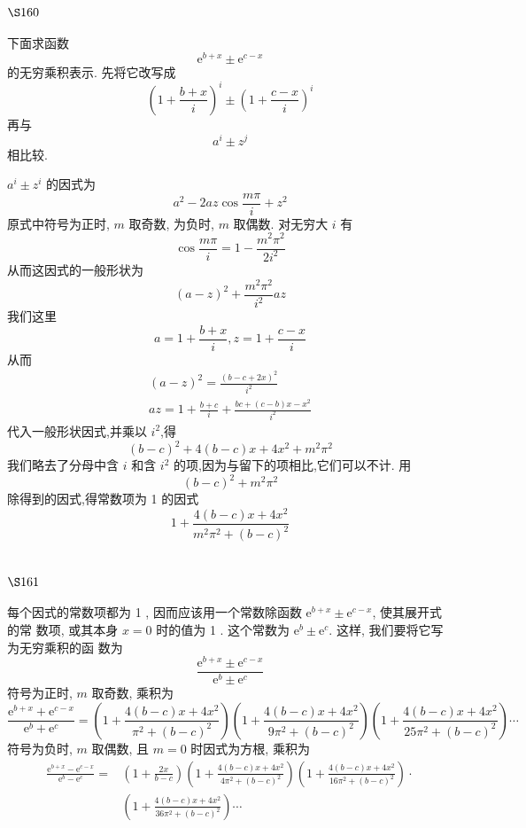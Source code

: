 \section{$\S 160$}

下面求函数
\[
\mathrm{e}^{b+x} \pm \mathrm{e}^{c-x}
\]
的无穷乘积表示. 先将它改写成
\[
\left(1+\frac{b+x}{i}\right)^{i} \pm\left(1+\frac{c-x}{i}\right)^{i}
\]
再与
\[
a^{i} \pm z^{j}
\]
相比较.

$a^{i} \pm z^{i}$ 的因式为
\[
a^{2}-2 a z \cos \frac{m \pi}{i}+z^{2}
\]
原式中符号为正时, $m$ 取奇数, 为负时, $m$ 取偶数. 对无穷大 $i$ 有
\[
\cos \frac{m \pi}{i}=1-\frac{m^{2} \pi^{2}}{2 i^{2}}
\]
从而这因式的一般形状为
\[
(a-z)^{2}+\frac{m^{2} \pi^{2}}{i^{2}} a z
\]
我们这里
\[
a=1+\frac{b+x}{i}, z=1+\frac{c-x}{i}
\]
从而
\[
\begin{gathered}
(a-z)^{2}=\frac{(b-c+2 x)^{2}}{i^{2}} \\
a z=1+\frac{b+c}{i}+\frac{b c+(c-b) x-x^{2}}{i^{2}}
\end{gathered}
\]
代入一般形状因式,并乘以 $i^{2}$,得
\[
(b-c)^{2}+4(b-c) x+4 x^{2}+m^{2} \pi^{2}
\]
我们略去了分母中含 $i$ 和含 $i^{2}$ 的项,因为与留下的项相比,它们可以不计. 用
\[
(b-c)^{2}+m^{2} \pi^{2}
\]
除得到的因式,得常数项为 1 的因式
\[
1+\frac{4(b-c) x+4 x^{2}}{m^{2} \pi^{2}+(b-c)^{2}}
\]
\section{$\S 161$}

每个因式的常数项都为 1 , 因而应该用一个常数除函数 $\mathrm{e}^{b+x} \pm \mathrm{e}^{c-x}$, 使其展开式的常 数项, 或其本身 $x=0$ 时的值为 1 . 这个常数为 $\mathrm{e}^{b} \pm \mathrm{e}^{c}$. 这样, 我们要将它写为无穷乘积的函 数为
\[
\frac{\mathrm{e}^{b+x} \pm \mathrm{e}^{c-x}}{\mathrm{e}^{b} \pm \mathrm{e}^{c}}
\]
符号为正时, $m$ 取奇数, 乘积为
\[
\frac{\mathrm{e}^{b+x}+\mathrm{e}^{c-x}}{\mathrm{e}^{b}+\mathrm{e}^{c}}=\left(1+\frac{4(b-c) x+4 x^{2}}{\pi^{2}+(b-c)^{2}}\right)\left(1+\frac{4(b-c) x+4 x^{2}}{9 \pi^{2}+(b-c)^{2}}\right)\left(1+\frac{4(b-c) x+4 x^{2}}{25 \pi^{2}+(b-c)^{2}}\right) \cdots
\]
符号为负时, $m$ 取偶数, 且 $m=0$ 时因式为方根, 乘积为
\[
\begin{aligned}
\frac{\mathrm{e}^{b+x}-\mathrm{e}^{c-x}}{\mathrm{e}^{b}-\mathrm{e}^{c}}= & \left(1+\frac{2 x}{b-c}\right)\left(1+\frac{4(b-c) x+4 x^{2}}{4 \pi^{2}+(b-c)^{2}}\right)\left(1+\frac{4(b-c) x+4 x^{2}}{16 \pi^{2}+(b-c)^{2}}\right) \cdot \\
& \left(1+\frac{4(b-c) x+4 x^{2}}{36 \pi^{2}+(b-c)^{2}}\right) \cdots
\end{aligned}
\]
